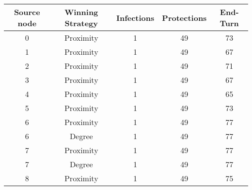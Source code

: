 \documentclass[results.tex]{subfiles}
\begin{document}
    \begin{center}
        \begin{tabular}{| c || c | c | c | c |}
            \hline
            {\bfseries Source node} & {\bfseries Winning Strategy} & {\bfseries Infections} & {\bfseries Protections}
            & {\bfseries End-Turn}
            \\  %
            \hline\hline
            0                       & Proximity                    & 1                      & 49                      & 73                   \\
            \hline
            1                       & Proximity                    & 1                      & 49                      & 67                   \\
            \hline
            2                       & Proximity                    & 1                      & 49                      & 71                   \\
            \hline
            3                       & Proximity                    & 1                      & 49                      & 67                   \\
            \hline
            4                       & Proximity                    & 1                      & 49                      & 65                   \\
            \hline
            5                       & Proximity                    & 1                      & 49                      & 73                   \\
            \hline
            6                       & Proximity                    & 1                      & 49                      & 77                   \\
            \hline
            6                       & Degree                       & 1                      & 49                      & 77                   \\
            \hline
            7                       & Proximity                    & 1                      & 49                      & 77                   \\
            \hline
            7                       & Degree                       & 1                      & 49                      & 77                   \\
            \hline
            8                       & Proximity                    & 1                      & 49                      & 75                   \\

\end{tabular}
\end{center}
\end{document}
